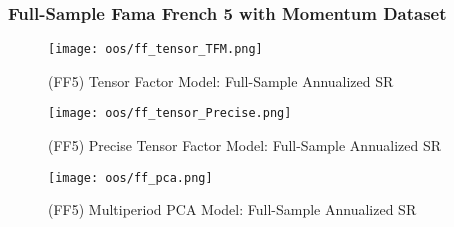 \subsubsection{Full-Sample Fama French 5 with Momentum Dataset}

\begin{figure}[H]
    \centering
    \texttt{[image: oos/ff\_tensor\_TFM.png]}
    \caption{(FF5) Tensor Factor Model: Full-Sample Annualized SR}\label{fig:ff-oos-tfm}
\end{figure}

\begin{figure}[H]
    \centering
    \texttt{[image: oos/ff\_tensor\_Precise.png]}
    \caption{(FF5) Precise Tensor Factor Model: Full-Sample Annualized SR}\label{fig:ff-oos-precise}
\end{figure}


\begin{figure}[H]
    \centering
    \texttt{[image: oos/ff\_pca.png]}
    \caption{(FF5) Multiperiod PCA Model: Full-Sample Annualized SR}\label{fig:ff-oos-pca}
\end{figure}
